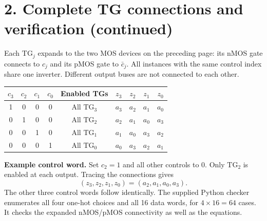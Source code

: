 \documentclass[11pt,a4paper]{article}
\newcommand{\TG}[4]{
  \node[draw,rounded corners=1pt,minimum width=11mm,minimum height=6mm,
        fill=accent!5,font=\small] (#1) at (#2,#3) {$\mathrm{TG}_{#4}$};
}
\begin{document}
\newpage
\section*{2. Complete TG connections and verification (continued)}
Each $\mathrm{TG}_j$ expands to the two MOS devices on the preceding page:
its nMOS gate connects to $c_j$ and its pMOS gate to $\bar c_j$.
All instances with the same control index share one inverter. Different output
buses are not connected to each other.
\begin{center}
\end{center}
\vspace{8pt}
\begin{center}
\begin{tabular}{ccccccccc}\toprule
$c_3$&$c_2$&$c_1$&$c_0$&Enabled TGs&$z_3$&$z_2$&$z_1$&$z_0$\\\midrule
1&0&0&0&All $\mathrm{TG}_3$&$a_3$&$a_2$&$a_1$&$a_0$\\
0&1&0&0&All $\mathrm{TG}_2$&$a_2$&$a_1$&$a_0$&$a_3$\\
0&0&1&0&All $\mathrm{TG}_1$&$a_1$&$a_0$&$a_3$&$a_2$\\
0&0&0&1&All $\mathrm{TG}_0$&$a_0$&$a_3$&$a_2$&$a_1$\\\bottomrule
\end{tabular}
\end{center}
\textbf{Example control word.} Set $c_2=1$ and all other controls to 0.
Only $\mathrm{TG}_2$ is enabled at each output. Tracing the connections gives
\[
 (z_3,z_2,z_1,z_0)=(a_2,a_1,a_0,a_3).
\]
The other three control words follow identically. The supplied Python checker
enumerates all four one-hot choices and all 16 data words, for $4\times16=64$
cases. It checks the expanded nMOS/pMOS connectivity as well as the equations.
\end{document}
